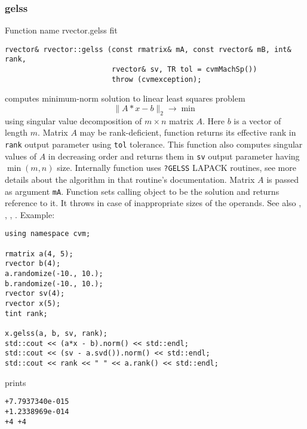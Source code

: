 \subsubsection{gelss}
Function%
\pdfdest name {rvector.gelss} fit
\begin{verbatim}
rvector& rvector::gelss (const rmatrix& mA, const rvector& mB, int& rank,
                         rvector& sv, TR tol = cvmMachSp())
                         throw (cvmexception);
\end{verbatim}
computes minimum-norm solution to linear
least squares problem 
\begin{equation*}
\|A*x-b\|_2\to\min
\end{equation*}
using singular value decomposition of $m\times n$ matrix $A$.
Here $b$ is a vector of length $m$.
Matrix $A$ may be rank-deficient,  function returns 
its effective rank in \verb"rank"
output parameter using \verb"tol" tolerance.
This function also computes
singular values of $A$ in decreasing order and returns them in \verb"sv" output parameter
having $\min(m,n)$ size.
Internally  function uses \verb"?GELSS" LAPACK routines, see more details
about the algorithm in that routine's documentation.
Matrix $A$ is passed as  argument \verb"mA".
Function sets calling object to be the solution and returns reference to it.
It throws
in case of inappropriate sizes of the operands.
See also , 
, , 
.
Example:
\begin{Verbatim}
using namespace cvm;

rmatrix a(4, 5);
rvector b(4);
a.randomize(-10., 10.);
b.randomize(-10., 10.);
rvector sv(4);
rvector x(5);
tint rank;

x.gelss(a, b, sv, rank);
std::cout << (a*x - b).norm() << std::endl;
std::cout << (sv - a.svd()).norm() << std::endl;
std::cout << rank << " " << a.rank() << std::endl;
\end{Verbatim}
prints
\begin{Verbatim}
+7.7937340e-015
+1.2338969e-014
+4 +4
\end{Verbatim}
\newpage



